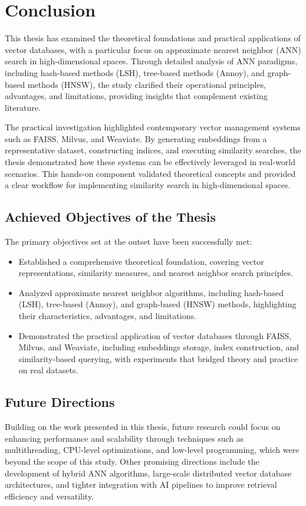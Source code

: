 \chapter*{Conclusion}

This thesis has examined the theoretical foundations and practical applications of vector databases, with a particular focus on approximate nearest neighbor (ANN) search in high-dimensional spaces. Through detailed analysis of ANN paradigms, including hash-based methods (LSH), tree-based methods (Annoy), and graph-based methods (HNSW), the study clarified their operational principles, advantages, and limitations, providing insights that complement existing literature.

The practical investigation highlighted contemporary vector management systems such as FAISS, Milvus, and Weaviate. By generating embeddings from a representative dataset, constructing indices, and executing similarity searches, the thesis demonstrated how these systems can be effectively leveraged in real-world scenarios. This hands-on component validated theoretical concepts and provided a clear workflow for implementing similarity search in high-dimensional spaces.

\section*{Achieved Objectives of the Thesis}

The primary objectives set at the outset have been successfully met:

\begin{itemize}
    \item Established a comprehensive theoretical foundation, covering vector representations, similarity measures, and nearest neighbor search principles.
    \item Analyzed approximate nearest neighbor algorithms, including hash-based (LSH), tree-based (Annoy), and graph-based (HNSW) methods, highlighting their characteristics, advantages, and limitations.
    \item Demonstrated the practical application of vector databases through FAISS, Milvus, and Weaviate, including embeddings storage, index construction, and similarity-based querying, with experiments that bridged theory and practice on real datasets.
\end{itemize}

\section*{Future Directions}

Building on the work presented in this thesis, future research could focus on enhancing performance and scalability through techniques such as multithreading, CPU-level optimizations, and low-level programming, which were beyond the scope of this study. Other promising directions include the development of hybrid ANN algorithms, large-scale distributed vector database architectures, and tighter integration with AI pipelines to improve retrieval efficiency and versatility.